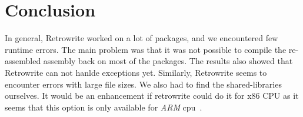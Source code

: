 \documentclass[a4paper,11pt,oneside]{report}
\newcommand{\sysname}{Retrowrite\xspace}
\begin{document}
\chapter{Conclusion}

In general, \sysname worked on a lot of packages, and we encountered few runtime
errors. The main problem was that it was not possible to compile the
re-assembled assembly back on most of the packages. The results also showed
that \sysname can not hanlde exceptions yet. Similarly, \sysname seems to
encounter errors with large file sizes. We also had to find the shared-libraries
ourselves. It would be an enhancement if retrowrite could do it for x86 CPU as
it seems that this option is only available for \textit{ARM}
cpu~\cite{retroArm}.

\cleardoublepage
{}
{}
\printbibliography
%
%
\end{document}
